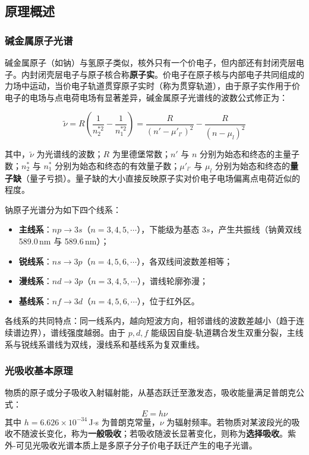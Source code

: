 \documentclass[dvipsnames, svgnames,a4paper,11pt]{article}
\begin{document}
\subsection{原理概述}

\subsubsection{碱金属原子光谱}

碱金属原子（如钠）与氢原子类似，核外只有一个价电子，但内部还有封闭壳层电子。内封闭壳层电子与原子核合称\textbf{原子实}。价电子在原子核与内部电子共同组成的力场中运动，当价电子轨道贯穿原子实时（称为贯穿轨道），由于原子实作用于价电子的电场与点电荷电场有显著差异，碱金属原子光谱线的波数公式修正为：

\begin{equation}
	\tilde{\nu} = R\left(\frac{1}{n_2^{*2}} - \frac{1}{n_1^{*2}}\right) = \frac{R}{(n' - \mu'_{l'})^2} - \frac{R}{(n - \mu_l)^2}
\end{equation}

其中，$\tilde{\nu}$ 为光谱线的波数；$R$ 为里德堡常数；$n'$ 与 $n$ 分别为始态和终态的主量子数；$n_2^*$ 与 $n_1^*$ 分别为始态和终态的有效量子数；$\mu'_{l'}$ 与 $\mu_l$ 分别为始态和终态的\textbf{量子缺}（量子亏损）。量子缺的大小直接反映原子实对价电子电场偏离点电荷近似的程度。

钠原子光谱分为如下四个线系：
\begin{itemize}
	\item \textbf{主线系}：$np \to 3s$（$n=3,4,5,\cdots$），下能级为基态 $3s$，产生共振线（钠黄双线 589.0\,nm 与 589.6\,nm）；
	\item \textbf{锐线系}：$ns \to 3p$（$n=4,5,6,\cdots$），各双线间波数差相等；
	\item \textbf{漫线系}：$nd \to 3p$（$n=3,4,5,\cdots$），谱线轮廓弥漫；
	\item \textbf{基线系}：$nf \to 3d$（$n=4,5,6,\cdots$），位于红外区。
\end{itemize}

各线系的共同特点：同一线系内，越向短波方向，相邻谱线的波数差越小（趋于连续谱边界），谱线强度越弱。由于 $p,d,f$ 能级因自旋-轨道耦合发生双重分裂，主线系与锐线系谱线为双线，漫线系和基线系为复双重线。

\subsubsection{光吸收基本原理}

物质的原子或分子吸收入射辐射能，从基态跃迁至激发态，吸收能量满足普朗克公式：
\begin{equation}
	E = h\nu
\end{equation}
其中 $h = 6.626\times10^{-34}$\,J$\cdot$s 为普朗克常量，$\nu$ 为辐射频率。若物质对某波段光的吸收不随波长变化，称为\textbf{一般吸收}；若吸收随波长显著变化，则称为\textbf{选择吸收}。紫外-可见光吸收光谱本质上是多原子分子价电子跃迁产生的电子光谱。
\end{document}
